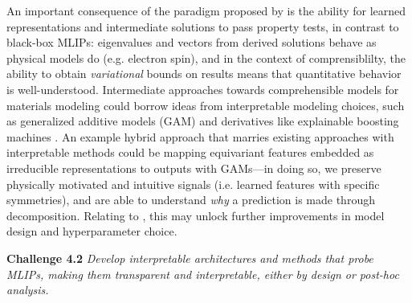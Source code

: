 An important consequence of the paradigm proposed by \citet{pfauAccurateComputationQuantum2024} is the ability for learned representations and intermediate solutions to pass property tests, in contrast to black-box MLIPs: eigenvalues and vectors from derived solutions behave as physical models do (e.g. electron spin), and in the context of comprensiblilty, the ability to obtain \emph{variational} bounds on results means that quantitative behavior is well-understood. Intermediate approaches towards comprehensible models for materials modeling could borrow ideas from interpretable modeling choices, such as generalized additive models (GAM) \citep{hastieGeneralizedAdditiveModels1986,woodGeneralizedAdditiveModels2024} and derivatives like explainable boosting machines \citep{louIntelligibleModelsClassification2012}. 
An example hybrid approach that marries existing approaches with interpretable methods could be mapping equivariant features embedded as irreducible representations to outputs with GAMs---in doing so, we preserve physically motivated and intuitive signals (i.e. learned features with specific symmetries), and are able to understand \emph{why} a prediction is made through decomposition. Relating to \citet{leeDeconstructingEquivariantRepresentations2024}, this may unlock further improvements in model design and hyperparameter choice.

\textbf{Challenge 4.2} \textit{Develop interpretable architectures and methods that probe MLIPs, making them transparent and interpretable, either by design or post-hoc analysis.}

